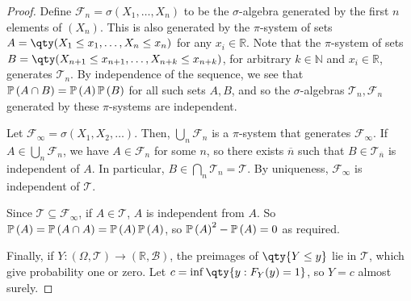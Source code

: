 \begin{proof}
	Define $\mathcal F_n = \sigma(X_1, \dots, X_n)$ to be the $\sigma$-algebra generated by the first $n$ elements of $(X_n)$.
	This is also generated by the $\pi$-system of sets $A = \qty(X_1 \leq x_1, \dots, X_n \leq x_n)$ for any $x_i \in \mathbb R$.
	Note that the $\pi$-system of sets $B = \qty(X_{n+1} \leq x_{n+1}, \dots, X_{n+k} \leq x_{n+k})$, for arbitrary $k \in \mathbb N$ and $x_i \in \mathbb R$, generates $\mathcal T_n$.
	By independence of the sequence, we see that $\mathbb{P}\left({A \cap B}\right) = \mathbb{P}\left({A}\right) \mathbb{P}\left({B}\right)$ for all such sets $A, B$, and so the $\sigma$-algebras $\mathcal T_n, \mathcal F_n$ generated by these $\pi$-systems are independent.

	Let $\mathcal F_\infty = \sigma(X_1, X_2, \dots)$.
	Then, $\bigcup_n \mathcal F_n$ is a $\pi$-system that generates $\mathcal F_\infty$.
	If $A \in \bigcup_n \mathcal F_n$, we have $A \in \mathcal F_n$ for some $n$, so there exists $\overline n$ such that $B \in \mathcal T_{\overline n}$ is independent of $A$.
	In particular, $B \in \bigcap_n \mathcal T_n = \mathcal T$.
	By uniqueness, $\mathcal F_\infty$ is independent of $\mathcal T$.

	Since $\mathcal T \subseteq \mathcal F_\infty$, if $A \in \mathcal T$, $A$ is independent from $A$.
	So $\mathbb{P}\left({A}\right) = \mathbb{P}\left({A \cap A}\right) = \mathbb{P}\left({A}\right)\mathbb{P}\left({A}\right)$, so $\mathbb{P}\left({A}\right)^2 - \mathbb{P}\left({A}\right) = 0$ as required.

	Finally, if $Y \colon (\Omega,\mathcal T) \to (\mathbb R,\mathcal B)$, the preimages of $\qty{Y \leq y}$ lie in $\mathcal T$, which give probability one or zero.
	Let $c = \inf\qty{y : F_Y(y) = 1}$, so $Y = c$ almost surely.
\end{proof}

